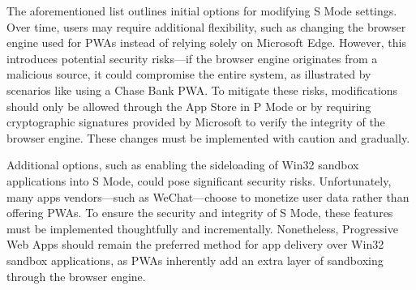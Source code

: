 The aforementioned list outlines initial options for modifying S Mode settings. Over time, users may require additional flexibility, such as changing the browser engine used for PWAs instead of relying solely on Microsoft Edge. However, this introduces potential security risks—if the browser engine originates from a malicious source, it could compromise the entire system, as illustrated by scenarios like using a Chase Bank PWA. To mitigate these risks, modifications should only be allowed through the App Store in P Mode or by requiring cryptographic signatures provided by Microsoft to verify the integrity of the browser engine. These changes must be implemented with caution and gradually.

Additional options, such as enabling the sideloading of Win32 sandbox applications into S Mode, could pose significant security risks. Unfortunately, many apps vendors—such as WeChat—choose to monetize user data rather than offering PWAs. To ensure the security and integrity of S Mode, these features must be implemented thoughtfully and incrementally. Nonetheless, Progressive Web Apps should remain the preferred method for app delivery over Win32 sandbox applications, as PWAs inherently add an extra layer of sandboxing through the browser engine.

